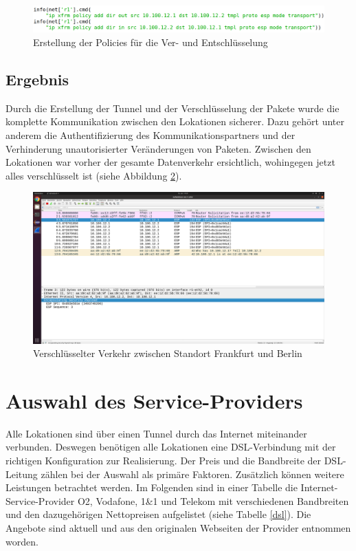 \documentclass[fontsize=12pt,paper=a4,open=any,parskip=half,
  twoside=false,toc=listof,toc=bibliography,fleqn,leqno,
  captions=nooneline,captions=tableabove,british]{scrbook}
\begin{document}
\begin{figure}[H]
 \centering
 \includegraphics[width=1.0\textwidth]{Bilder/policy}
 \captionsetup{justification=centering,margin=2cm}
 \caption{Erstellung der Policies für die Ver- und Entschlüsselung}
 \label{policy}
\end{figure}

\subsection{Ergebnis}
Durch die Erstellung der Tunnel und der Verschlüsselung der Pakete wurde die komplette Kommunikation zwischen den Lokationen sicherer. Dazu gehört unter anderem die Authentifizierung des Kommunikationspartners und der Verhinderung unautorisierter Veränderungen von Paketen. Zwischen den Lokationen war vorher der gesamte Datenverkehr ersichtlich, wohingegen jetzt alles verschlüsselt ist (siehe Abbildung \ref{esp}).

\begin{figure}[H]
 \centering
 \includegraphics[width=1.0\textwidth]{Bilder/esp}
 \captionsetup{justification=centering,margin=2cm}
 \caption{Verschlüsselter Verkehr zwischen Standort Frankfurt und Berlin}
 \label{esp}
\end{figure}

\section{Auswahl des Service-Providers}
Alle Lokationen sind über einen Tunnel durch das Internet miteinander verbunden. Deswegen benötigen alle Lokationen eine DSL-Verbindung mit der richtigen Konfiguration zur Realisierung. Der Preis und die Bandbreite der DSL-Leitung zählen bei der Auswahl als primäre Faktoren. Zusätzlich können weitere Leistungen betrachtet werden. Im Folgenden sind in einer Tabelle die Internet-Service-Provider O2, Vodafone, 1\&1 und Telekom mit verschiedenen Bandbreiten und den dazugehörigen Nettopreisen aufgelistet (siehe Tabelle \ref{dsl}). Die Angebote sind aktuell und aus den originalen Webseiten der Provider entnommen worden.
\end{document}
